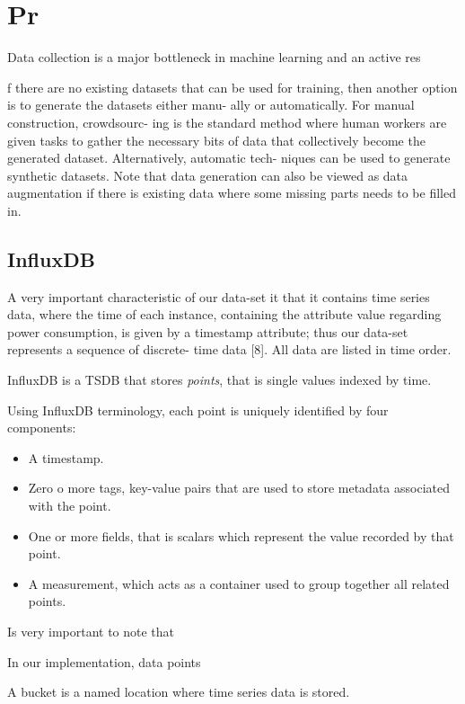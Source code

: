 \documentclass[10pt,a4paper]{report}
\theoremstyle{definition}
\begin{document}
\section{Pr}

Data collection is a major bottleneck in machine learning and an active res


f there are no existing datasets that can be used for training,
then another option is to generate the datasets either manu-
ally or automatically. For manual construction, crowdsourc-
ing is the standard method where human workers are given
tasks to gather the necessary bits of data that collectively
become the generated dataset. Alternatively, automatic tech-
niques can be used to generate synthetic datasets. Note that
data generation can also be viewed as data augmentation if
there is existing data where some missing parts needs to be
filled in.

\subsection{InfluxDB}

A very important characteristic of our data-set it that it contains time series data, where the time of each instance, containing the attribute value regarding power consumption, is given by a timestamp attribute; thus our data-set represents a sequence of discrete-
time data [8]. All data are listed in time order.


InfluxDB is a TSDB that stores \textit{points}, that is single values indexed by time. 

Using InfluxDB terminology, each point is uniquely identified by four components:

\begin{itemize}
	\item A timestamp.
	
	\item Zero o more tags, key-value pairs that are used to store metadata associated with the point. 
	 
	\item One or more fields, that is scalars which represent the value recorded by that point.
	
	\item A measurement, which acts as a container used to group together all related points.
	
\end{itemize}

Is very important to note that  

In our implementation, data points 

A bucket is a named location where time series data is stored.







\end{document}
